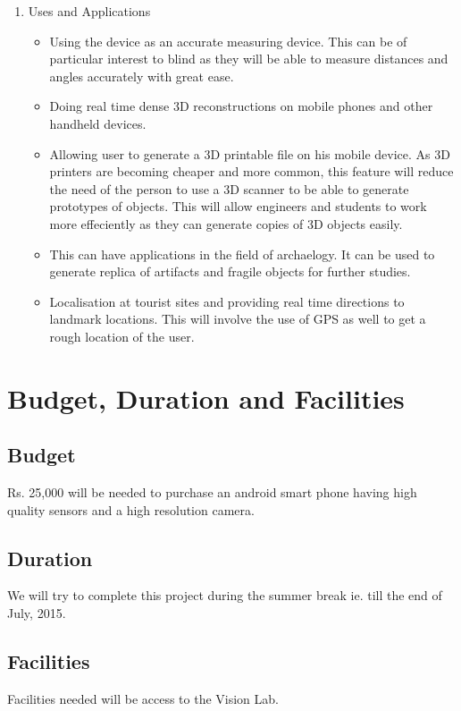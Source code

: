 \documentclass{article}
\begin{document}
\begin{enumerate}
			\item Uses and Applications
			\begin{itemize}
				\item Using the device as an accurate measuring device. This can be of particular interest to blind as they will be able to measure distances and angles accurately with great ease.
				\item Doing real time dense 3D reconstructions on mobile phones and other handheld devices. 
				\item Allowing user to generate a 3D printable file on his mobile device. As 3D printers are becoming cheaper and more common, this feature will reduce the need of the person to use a 3D scanner to be able to generate prototypes of objects. This will allow engineers and students to work more effeciently as they can generate copies of 3D objects easily.
				\item This can have applications in the field of archaelogy. It can be used to generate replica of artifacts and fragile objects for further studies.
				\item Localisation at tourist sites and providing real time directions to landmark locations. This will involve the use of GPS as well to get a rough location of the user.
			\end{itemize}
		\end{enumerate}
	\section{Budget, Duration and Facilities}	
		\subsection{Budget}
			Rs. 25,000 will be needed to purchase an android smart phone having high quality sensors and a high resolution camera.
		\subsection{Duration}
			We will try to complete this project during the summer break ie. till the end of July, 2015. 
		\subsection{Facilities}
			Facilities needed will be access to the Vision Lab.
\end{document}
